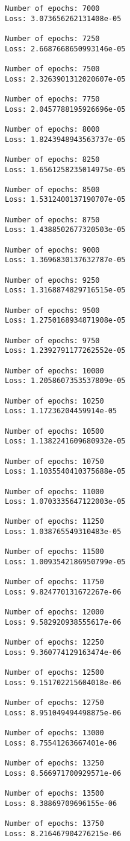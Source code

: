 \documentclass[11pt]{article}
\begin{document}
\begin{Verbatim}[commandchars=\\\{\}]
Number of epochs: 7000
Loss: 3.073656262131408e-05

Number of epochs: 7250
Loss: 2.6687668650993146e-05

Number of epochs: 7500
Loss: 2.3263901312020607e-05

Number of epochs: 7750
Loss: 2.0457788195926696e-05

Number of epochs: 8000
Loss: 1.8243948943563737e-05

Number of epochs: 8250
Loss: 1.6561258235014975e-05

Number of epochs: 8500
Loss: 1.5312400137190707e-05

Number of epochs: 8750
Loss: 1.4388502677320503e-05

Number of epochs: 9000
Loss: 1.3696830137632787e-05

Number of epochs: 9250
Loss: 1.3168874829716515e-05

Number of epochs: 9500
Loss: 1.2750168934871908e-05

Number of epochs: 9750
Loss: 1.2392791177262552e-05

Number of epochs: 10000
Loss: 1.2058607353537809e-05

Number of epochs: 10250
Loss: 1.17236204459914e-05

Number of epochs: 10500
Loss: 1.1382241609680932e-05

Number of epochs: 10750
Loss: 1.1035540410375688e-05

Number of epochs: 11000
Loss: 1.0703335647122003e-05

Number of epochs: 11250
Loss: 1.038765549310483e-05

Number of epochs: 11500
Loss: 1.0093542186950799e-05

Number of epochs: 11750
Loss: 9.824770131672267e-06

Number of epochs: 12000
Loss: 9.582920938555617e-06

Number of epochs: 12250
Loss: 9.360774129163474e-06

Number of epochs: 12500
Loss: 9.151702215604018e-06

Number of epochs: 12750
Loss: 8.951049494498875e-06

Number of epochs: 13000
Loss: 8.75541263667401e-06

Number of epochs: 13250
Loss: 8.566971700929571e-06

Number of epochs: 13500
Loss: 8.38869709696155e-06

Number of epochs: 13750
Loss: 8.216467904276215e-06

    \end{Verbatim}
\end{document}
